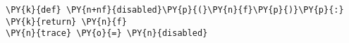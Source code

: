 \begin{Verbatim}[commandchars=\\\{\}]
\PY{k}{def} \PY{n+nf}{disabled}\PY{p}{(}\PY{n}{f}\PY{p}{)}\PY{p}{:} \PY{k}{return} \PY{n}{f}
\PY{n}{trace} \PY{o}{=} \PY{n}{disabled}
\end{Verbatim}
